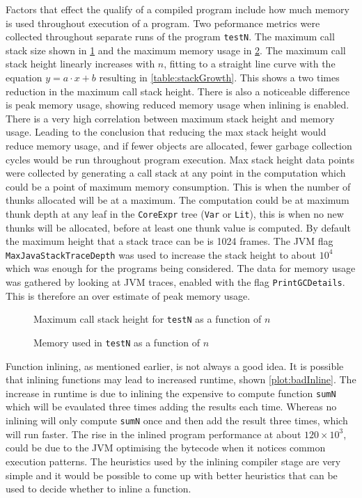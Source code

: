\documentclass[float=false, crop=false]{standalone}
\newlength\gwidth
\newlength\gheight
\newcommand{\importMGraph}[3]{\setlength{\gwidth}{#2}\setlength{\gheight}{#3}{#1}}
\begin{document}
Factors that effect the qualify of a compiled program include how much memory
is used throughout execution of a program. Two peformance metrics were collected throughout
separate runs of the program \texttt{testN}. The maximum call stack size
shown in \cref{plot:stackSize} and the maximum 
memory usage in \cref{plot:memUsed}. 
The maximum call stack height linearly increases with $n$, fitting to a straight line curve
with the equation $y = a\cdot x + b$ resulting in \cref{table:stackGrowth}.
This shows a two times reduction in the maximum call stack height. 
There is also a noticeable difference is peak memory usage, 
showing reduced memory usage when inlining is enabled.
There is a very high correlation between maximum stack height and memory usage.
Leading to the conclusion that reducing the max stack height would 
reduce memory usage, and if fewer objects are allocated, fewer garbage collection cycles would be
run throughout program execution.
Max stack height data points were collected by generating a call stack at any 
point in the computation which could be a point of maximum memory consumption. This is when 
the number of thunks allocated will be at a maximum.
The computation could be at maximum thunk depth at any leaf in the \texttt{CoreExpr} tree
(\texttt{Var} or \texttt{Lit}), this is when no new thunks will be allocated, before at least one thunk
value is computed. By default the maximum height that a stack trace can be is 1024 frames. 
The JVM flag \texttt{MaxJavaStackTraceDepth} was used to increase
the stack height to about $10^{4}$ which was enough for the programs being considered.
The data for memory usage was gathered by looking at JVM traces, 
enabled with the flag \texttt{PrintGCDetails}. 
This is therefore an over estimate of peak memory usage. 

\begin{figure}
  \centering
  \importMGraph{plotCallStackGrowth}{0.96\textwidth}{0.3\textwidth}
  \caption{Maximum call stack height for \texttt{testN} as a function of $n$}
  \label{plot:stackSize}
\end{figure}

\begin{figure}
  \centering
  \importMGraph{memUsed}{0.96\textwidth}{0.3\textwidth}
  \caption{Memory used in \texttt{testN} as a function of $n$}
  \label{plot:memUsed}
\end{figure}
Function inlining, as mentioned earlier, is not always a good idea.
It is possible that inlining functions may lead to increased runtime, shown  
\cref{plot:badInline}. 
The increase in runtime is due to inlining the expensive to compute function 
\texttt{sumN} which will be evaulated three times adding the results each time. 
Whereas no inlining will only compute \texttt{sumN} once and then add the result three times, 
which will run faster. The rise in the inlined program performance at about $120 \times 10^3$, 
could be due to the JVM optimising the bytecode when it notices common execution patterns.
The heuristics used by the inlining compiler stage are very simple and it would be possible to 
come up with better heuristics that can be used to decide whether to inline a function.
\end{document}
